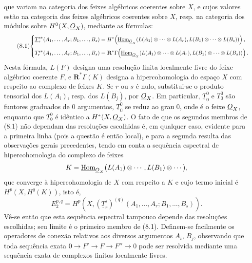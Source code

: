 que variam na categoria dos feixes algébricos coerentes sobre $X$, e cujos
valores estão na categoria dos feixes algébricos coerentes sobre $X$,
resp. na categoria dos módulos sobre $H^{0}(X,\underline{O}_X)$, mediante as fórmulas:
\begin{equation}\tag{8.1}
\resizebox{\textwidth}{!}{$
\left\{
\begin{aligned}
\underline{T}_{r}^{s*}(A_1,\ldots,A_r;B_1,\ldots,B_s)
  &={}H^{*}\!\left(
    \Homsh_{\Osh_X}\!\left(
      L(A_1)\otimes\cdots\otimes L(A_r),
      L(B_1)\otimes\cdots\otimes L(B_s)
    \right)\right),\\[3pt]
T_{r}^{s*}(A_1,\ldots,A_r;B_1,\ldots,B_s)
  &={}\mathbf R^{*}\Gamma\!\left(
    \Homsh_{\Osh_X}\!\left(
      L(A_1)\otimes\cdots\otimes L(A_r),
      L(B_1)\otimes\cdots\otimes L(B_s)
    \right)\right).
\end{aligned}
\right.
$}
\end{equation}
Nesta fórmula, $L(F)$ designa uma resolução finita localmente livre do
feixe algébrico coerente $F$, e $\mathbf R^{*}\Gamma(K)$ designa
a hipercohomologia do espaço $X$ com respeito ao complexo de feixes $K$. Se
$r$ ou $s$ é nulo, substitui-se o produto tensorial dos $L(A_i)$, resp. dos
$L(B_j)$, por $\underline{O}_X$. Em particular, $\underline{T}_{0}^{0}$ e $T_{0}^{0}$
são funtores graduados de 0 argumentos, $\underline{T}_{0}^{0}$ se reduz ao
grau 0, onde é o feixe $\underline{O}_X$, enquanto que $T_{0}^{0}$ é idêntico a
$H^{*}(X,\underline{O}_X)$. O fato de que os segundos membros de (8.1) não dependam
das resoluções escolhidas é, em qualquer caso, evidente para a primeira linha
(pois a questão é então local), e para a segunda resulta das observações
gerais precedentes, tendo em conta a sequência espectral de
hipercohomologia do complexo de feixes
\[
  K=\underline{\operatorname{Hom}}_{\underline{O}_X}\bigl(L(A_1)\otimes\cdots,
      L(B_1)\otimes\cdots\bigr),
\]
que converge à hipercohomologia de $X$ com respeito a $K$ e cujo termo
inicial é $H^{p}(X,H^{q}(K))$, isto é,
\begin{equation}\tag{8.2}
  E_{2}^{p,q}
  =H^{p}\!\left(X,
    (\underline{T}_{r}^{s})^{(q)}
      (A_1,\ldots,A_r;B_1,\ldots,B_s)\right).
\end{equation}
Vê-se então que esta sequência espectral tampouco depende das resoluções
escolhidas; seu limite é o primeiro membro de (8.1). Definem-se
facilmente os operadores de conexão relativos aos diversos argumentos $A_i$, $B_j$,
observando que toda sequência exata
$0\longrightarrow F'\longrightarrow F\longrightarrow F''\longrightarrow0$
pode ser resolvida mediante uma sequência exata de complexos finitos localmente livres.

